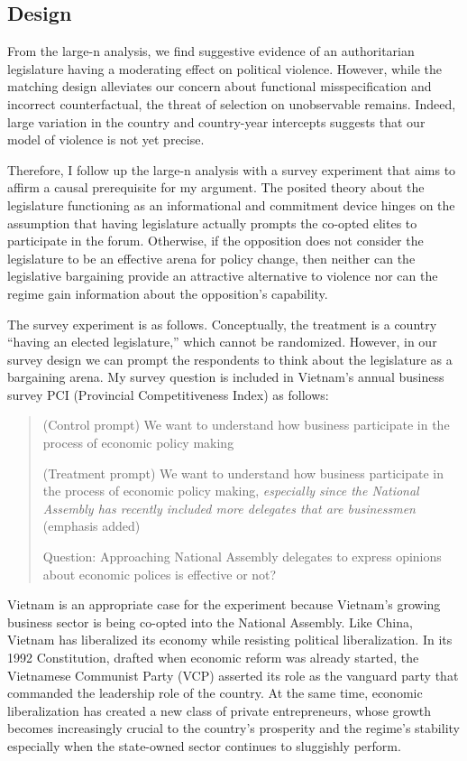 \subsection{Design}

From the large-n analysis, we find suggestive evidence of an authoritarian legislature having a moderating effect on political violence. However, while the matching design alleviates our concern about functional misspecification and incorrect counterfactual, the threat of selection on unobservable remains. Indeed, large variation in the country and country-year intercepts suggests that our model of violence is not yet precise.

Therefore, I follow up the large-n analysis with a survey experiment that aims to affirm a causal prerequisite for my argument. The posited theory about the legislature functioning as an informational and commitment device hinges on the assumption that having legislature actually prompts the co-opted elites to participate in the forum. Otherwise, if the opposition does not consider the legislature to be an effective arena for policy change, then neither can the legislative bargaining provide an attractive alternative to violence nor can the regime gain information about the opposition's capability.

The survey experiment is as follows. Conceptually, the treatment is a country ``having an elected legislature,'' which cannot be randomized. However, in our survey design we can prompt the respondents to think about the legislature as a bargaining arena. My survey question is included in Vietnam's annual business survey PCI (Provincial Competitiveness Index) as follows:

\begin{quote}
(Control prompt) We want to understand how business participate in the process of economic policy making

(Treatment prompt) We want to understand how business participate in the process of economic policy making, \textit{especially since the National Assembly has recently included more delegates that are businessmen} (emphasis added)

Question: Approaching National Assembly delegates to express opinions about economic polices is effective or not?
\end{quote}

Vietnam is an appropriate case for the experiment because Vietnam's growing business sector is being co-opted into the National Assembly. Like China, Vietnam has liberalized its economy while resisting political liberalization. In its 1992 Constitution, drafted when economic reform was already started, the Vietnamese Communist Party (VCP) asserted its role as the vanguard party that commanded the leadership role of the country. At the same time, economic liberalization has created a new class of private entrepreneurs, whose growth becomes increasingly crucial to the country's prosperity and the regime's stability especially when the state-owned sector continues to sluggishly perform. 

